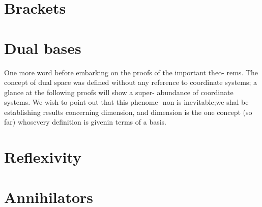 \section{Brackets}

\section{Dual bases}
One more word before embarking on the proofs of the important theo- rems. The concept of dual space was defined without any reference to coordinate systems; a glance at the following proofs will show a super- abundance of coordinate systems. We wish to point out that this phenome-
non is inevitable;we shal be establishing results concerning dimension, and dimension is the one concept (so far) whosevery definition is givenin terms of a basis.

\section{Reflexivity}

\section{Annihilators}

